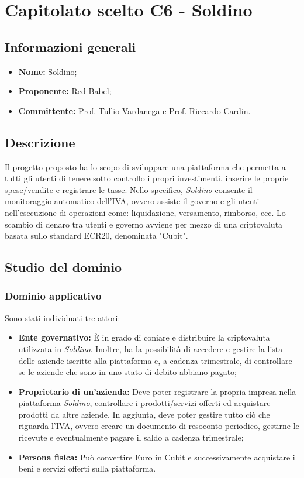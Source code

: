 \section{Capitolato scelto C6 - Soldino}
\subsection{Informazioni generali}
% 
\begin{itemize}
\item
\textbf{Nome:} Soldino;
\item
\textbf{Proponente:} Red Babel;
\item
\textbf{Committente:} Prof. Tullio Vardanega e Prof. Riccardo Cardin.
\end{itemize}

\subsection{Descrizione}
Il progetto proposto ha lo scopo di sviluppare una piattaforma che permetta a 
tutti gli utenti di tenere sotto controllo i propri investimenti, inserire le 
proprie spese/vendite e registrare le tasse. Nello specifico, \textit{Soldino} 
consente il monitoraggio automatico dell'IVA, ovvero assiste il governo e gli 
utenti nell'esecuzione di operazioni come: liquidazione, versamento, rimborso, 
ecc. Lo scambio di denaro tra utenti e governo avviene per mezzo di una 
criptovaluta basata sullo standard ECR20\glo{}, denominata "Cubit"\glo{}. 


\subsection{Studio del dominio}
\subsubsection{Dominio applicativo}
Sono stati individuati tre attori:
\begin{itemize}	
	\item \textbf{Ente governativo: }\`E in grado di coniare e distribuire la 
	criptovaluta utilizzata in \textit{Soldino}. Inoltre, ha la possibilità di 
accedere e gestire la lista delle aziende iscritte alla piattaforma e, a cadenza 
trimestrale, di controllare se le aziende che sono in uno stato di debito 
abbiano pagato;
	\item \textbf{Proprietario di un'azienda:} Deve poter registrare la propria 
impresa nella piattaforma \textit{Soldino}, controllare i prodotti/servizi 
offerti ed acquistare prodotti da altre aziende. In aggiunta, deve poter gestire
tutto ciò che riguarda l'IVA, ovvero creare un documento di resoconto periodico,
gestirne le ricevute e eventualmente pagare il saldo a cadenza trimestrale;
	\item \textbf{Persona fisica\glo: }Può convertire Euro in Cubit e 
successivamente acquistare i beni e servizi offerti sulla piattaforma. 
\end{itemize}

